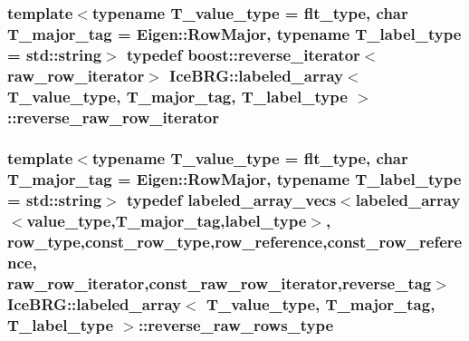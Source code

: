 \subsubsection[{reverse\+\_\+raw\+\_\+row\+\_\+iterator}]{\setlength{\rightskip}{0pt plus 5cm}template$<$typename T\+\_\+value\+\_\+type = flt\+\_\+type, char T\+\_\+major\+\_\+tag = Eigen\+::\+Row\+Major, typename T\+\_\+label\+\_\+type = std\+::string$>$ typedef boost\+::reverse\+\_\+iterator$<${\bf raw\+\_\+row\+\_\+iterator}$>$ {\bf Ice\+B\+R\+G\+::labeled\+\_\+array}$<$ T\+\_\+value\+\_\+type, T\+\_\+major\+\_\+tag, T\+\_\+label\+\_\+type $>$\+::{\bf reverse\+\_\+raw\+\_\+row\+\_\+iterator}}\label{classIceBRG_1_1labeled__array_a211a4c8c7435da2eea6481b434bfdef1}
\hypertarget{classIceBRG_1_1labeled__array_ae4ef7537f1bfb799048e17588ccd2be0}{}
\subsubsection[{reverse\+\_\+raw\+\_\+rows\+\_\+type}]{\setlength{\rightskip}{0pt plus 5cm}template$<$typename T\+\_\+value\+\_\+type = flt\+\_\+type, char T\+\_\+major\+\_\+tag = Eigen\+::\+Row\+Major, typename T\+\_\+label\+\_\+type = std\+::string$>$ typedef {\bf labeled\+\_\+array\+\_\+vecs}$<${\bf labeled\+\_\+array}$<${\bf value\+\_\+type},T\+\_\+major\+\_\+tag,{\bf label\+\_\+type}$>$, {\bf row\+\_\+type},{\bf const\+\_\+row\+\_\+type},{\bf row\+\_\+reference},{\bf const\+\_\+row\+\_\+reference}, {\bf raw\+\_\+row\+\_\+iterator},{\bf const\+\_\+raw\+\_\+row\+\_\+iterator},{\bf reverse\+\_\+tag}$>$ {\bf Ice\+B\+R\+G\+::labeled\+\_\+array}$<$ T\+\_\+value\+\_\+type, T\+\_\+major\+\_\+tag, T\+\_\+label\+\_\+type $>$\+::{\bf reverse\+\_\+raw\+\_\+rows\+\_\+type}}\label{classIceBRG_1_1labeled__array_ae4ef7537f1bfb799048e17588ccd2be0}
\hypertarget{classIceBRG_1_1labeled__array_a00f3c91706206fdb42140d6b2d30839b}{}
